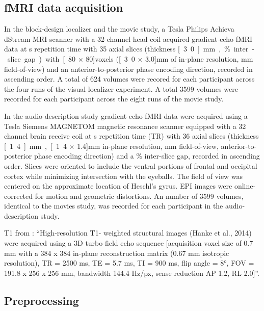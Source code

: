 \subsection{fMRI data acquisition}
%
In the block-design localizer and the movie study, a \unit[3]{Tesla} Philips
Achieva dStream MRI scanner with a 32 channel head coil acquired gradient-echo
fMRI data at \unit[2]{s} repetition time with
35 axial slices (thickness \unit[3.0]{mm}, \unit[10]{\%} inter-slice gap) with
\unit[80 $\times$ 80]{voxels} (\unit[3.0 $\times$ 3.0]{mm} of in-plane
resolution, \unit[240]{mm} field-of-view) and an anterior-to-posterior phase
encoding direction, recorded in ascending order.
A total of 624 volumes were recored for each participant across the four runs of
the visual localizer experiment.
%
A total 3599 volumes were recorded for each participant across the eight runs of
the movie study.

In the audio-description study gradient-echo fMRI data were acquired using a
\unit[7]{Tesla} Siemens MAGNETOM magnetic resonance scanner equipped with a 32
channel brain receive coil at \unit[2]{s} repetition time (TR) with 36 axial
slices (thickness \unit[1.4]{mm}, \unit[1.4 $\times$ 1.4]{mm} in-plane
resolution, \unit[224]{mm} field-of-view, anterior-to-posterior phase encoding
direction) and a \unit[10]{\%} inter-slice gap, recorded in ascending order.
Slices were oriented to include the ventral portions of frontal and occipital
cortex while minimizing intersection with the eyeballs.
The field of view was centered on the approximate location of Heschl's gyrus.
EPI images were online-corrected for motion and geometric distortions.
%
An number of 3599 volumes, identical to the movies study, was recorded for each
participant in the audio-description study.

%
T1 from \citep{ben2018hippocampal}: ``High-resolution T1- weighted structural
images (Hanke et al., 2014) were acquired using a 3D turbo field echo sequence
[acquisition voxel size of 0.7 mm with a 384 x 384 in-plane reconstruction
matrix (0.67 mm isotropic resolution), TR = 2500 ms, TE = 5.7 ms, TI = 900 ms,
flip angle = 8°, FOV = 191.8 x 256 x 256 mm, bandwidth 144.4 Hz/px, sense
reduction AP 1.2, RL 2.0]''.


\subsection{Preprocessing}

